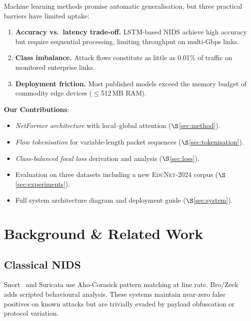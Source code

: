 \documentclass[conference]{IEEEtran}
\begin{document}
Machine learning methods promise automatic generalisation, but three
practical barriers have limited uptake:
\begin{enumerate}
	\item \textbf{Accuracy vs.\ latency trade-off.} LSTM-based NIDS
	      achieve high accuracy but require sequential processing,
	      limiting throughput on multi-Gbps links.
	\item \textbf{Class imbalance.} Attack flows constitute as little as
	      0.01\% of traffic on monitored enterprise links.
	\item \textbf{Deployment friction.} Most published models exceed the
	      memory budget of commodity edge devices ($\leq$512\,MB RAM).
\end{enumerate}

\noindent\textbf{Our Contributions}:
\begin{itemize}
	\item \emph{NetFormer architecture} with local--global attention
	      ($\S$\ref{sec:method}).
	\item \emph{Flow tokenisation} for variable-length packet sequences
	      ($\S$\ref{sec:tokenisation}).
	\item \emph{Class-balanced focal loss} derivation and analysis
	      ($\S$\ref{sec:loss}).
	\item Evaluation on three datasets including a new
	      \textsc{EduNet-2024} corpus ($\S$\ref{sec:experiments}).
	\item Full system architecture diagram and deployment guide
	      ($\S$\ref{sec:system}).
\end{itemize}

\section{Background \& Related Work}
\label{sec:related}

\subsection{Classical NIDS}

Snort~\cite{ref:roesch1999} and Suricata use Aho-Corasick pattern
matching at line rate. Bro/Zeek adds scripted behavioural analysis.
These systems maintain near-zero false positives on known attacks but
are trivially evaded by payload obfuscation or protocol variation.
\end{document}
